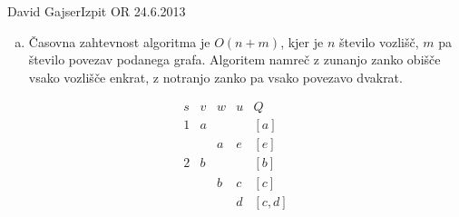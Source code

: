 \begin{naloga}{David Gajser}{Izpit OR 24.6.2013}
\begin{odgovor}
\begin{enumerate}[(a)]
\item Časovna zahtevnost algoritma je $O(n + m)$,
kjer je $n$ število vozlišč, $m$ pa število povezav podanega grafa.
Algoritem namreč z zunanjo zanko obišče vsako vozlišče enkrat,
z notranjo zanko pa vsako povezavo dvakrat.
\end{enumerate}
%
\begin{tabela}
$$
\begin{array}{ccccl}
s & v & w & u & Q \\ \hline
1 & a &   &   & [a] \\
  &   & a & e & [e] \\
2 & b &   &   & [b] \\
  &   & b & c & [c] \\
  &   &   & d & [c, d]
\end{array}
$$
\end{tabela}
\end{odgovor}
\end{naloga}
